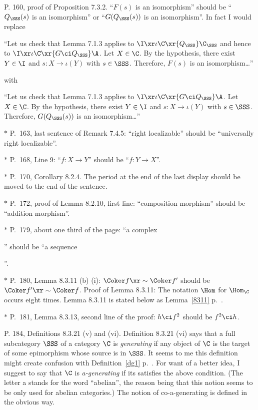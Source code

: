 \documentclass[12pt]{article}
\theoremstyle{remark}
\theoremstyle{definition}
\begin{document}
%

\begin{s}
P. 160, proof of Proposition 7.3.2. ``$F(s)$ is an isomorphism'' should be ``$Q_\SSS(s)$ is an isomorphism'' or ``$G(Q_\SSS(s))$ is an isomorphism''. In fact I would replace 

\nn``Let us check that Lemma 7.1.3 applies to $\I\xr\iota\C\xr{Q_\SSS}\C_\SSS$ and hence to $\I\xr\iota\C\xr{G\ci Q_\SSS}\A$. Let $X\in\C$. By the hypothesis, there exist $Y\in\I$ and $s:X\to\iota(Y)$ with $s\in\SSS$. Therefore, $F(s)$ is an isomorphism\dots''

\nn with

\nn``Let us check that Lemma 7.1.3 applies to $\I\xr\iota\C\xr{G\ci Q_\SSS}\A$. Let $X\in\C$. By the hypothesis, there exist $Y\in\I$ and $s:X\to\iota(Y)$ with $s\in\SSS$. Therefore, $G(Q_\SSS(s))$ is an isomorphism\dots''
\end{s}

%

\nn$*$ P.~163, last sentence of Remark 7.4.5: ``right localizable'' should be ``universally right localizable''.

\nn$*$ P.~168, Line 9: ``$f:X\to Y$'' should be ``$f:Y\to X$''.

\nn$*$ P.~170, Corollary 8.2.4. The period at the end of the last display should be moved to the end of the sentence.

\nn$*$ P.~172, proof of Lemma 8.2.10, first line: ``composition morphism'' should be ``addition morphism''.

\nn$*$ P.~179, about one third of the page: ``a complex 
'' 
should be ``a sequence 
''.

\nn$*$ P.~180, Lemma 8.3.11 (b) (i): $\Coker f\xr\sim\Coker f'$ should be $\Coker f'\xr\sim\Coker f$. Proof of Lemma 8.3.11: The notation $\Hom$ for $\Hom_\C$ occurs eight times. Lemma 8.3.11 is stated below as Lemma~\ref{8311} p.~. 

\nn$*$ P.~181, Lemma 8.3.13, second line of the proof: $h\ci f^2$ should be $f^2\ci h$. 

\begin{s} 
P. 184, Definitions 8.3.21 (v) and (vi). Definition 8.3.21 (vi) says that a full subcategory $\SSS$ of a category $\C$ is \emph{generating} if any object of $\C$ is the target of some epimorphism whose source is in $\SSS$. It seems to me this definition might create confusion with Definition~\ref{dg1} p.~. For want of a better idea, I suggest to say that $\C$ is \emph{a-generating} if its satisfies the above condition. (The letter a stands for the word ``abelian'', the reason being that this notion seems to be only used for abelian categories.) The notion of co-a-generating is defined in the obvious way.
\end{s} 
\end{document}
